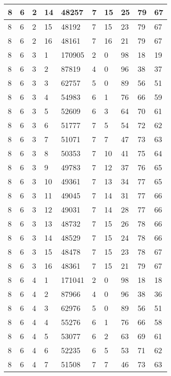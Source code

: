 \begin{table}[!ht]
\begin{tabular}{|l|l|l|l|l|l|l|l|l|l|}
        8 & 6 & 2 & 14 & 48257 & 7 & 15 & 25 & 79 & 67 \\ \hline
        8 & 6 & 2 & 15 & 48192 & 7 & 15 & 23 & 79 & 67 \\ \hline
        8 & 6 & 2 & 16 & 48161 & 7 & 16 & 21 & 79 & 67 \\ \hline
        8 & 6 & 3 & 1 & 170905 & 2 & 0 & 98 & 18 & 19 \\ \hline
        8 & 6 & 3 & 2 & 87819 & 4 & 0 & 96 & 38 & 37 \\ \hline
        8 & 6 & 3 & 3 & 62757 & 5 & 0 & 89 & 56 & 51 \\ \hline
        8 & 6 & 3 & 4 & 54983 & 6 & 1 & 76 & 66 & 59 \\ \hline
        8 & 6 & 3 & 5 & 52609 & 6 & 3 & 64 & 70 & 61 \\ \hline
        8 & 6 & 3 & 6 & 51777 & 7 & 5 & 54 & 72 & 62 \\ \hline
        8 & 6 & 3 & 7 & 51071 & 7 & 7 & 47 & 73 & 63 \\ \hline
        8 & 6 & 3 & 8 & 50353 & 7 & 10 & 41 & 75 & 64 \\ \hline
        8 & 6 & 3 & 9 & 49783 & 7 & 12 & 37 & 76 & 65 \\ \hline
        8 & 6 & 3 & 10 & 49361 & 7 & 13 & 34 & 77 & 65 \\ \hline
        8 & 6 & 3 & 11 & 49045 & 7 & 14 & 31 & 77 & 66 \\ \hline
        8 & 6 & 3 & 12 & 49031 & 7 & 14 & 28 & 77 & 66 \\ \hline
        8 & 6 & 3 & 13 & 48732 & 7 & 15 & 26 & 78 & 66 \\ \hline
        8 & 6 & 3 & 14 & 48529 & 7 & 15 & 24 & 78 & 66 \\ \hline
        8 & 6 & 3 & 15 & 48478 & 7 & 15 & 23 & 78 & 67 \\ \hline
        8 & 6 & 3 & 16 & 48361 & 7 & 15 & 21 & 79 & 67 \\ \hline
        8 & 6 & 4 & 1 & 171041 & 2 & 0 & 98 & 18 & 18 \\ \hline
        8 & 6 & 4 & 2 & 87966 & 4 & 0 & 96 & 38 & 36 \\ \hline
        8 & 6 & 4 & 3 & 62976 & 5 & 0 & 89 & 56 & 51 \\ \hline
        8 & 6 & 4 & 4 & 55276 & 6 & 1 & 76 & 66 & 58 \\ \hline
        8 & 6 & 4 & 5 & 53077 & 6 & 2 & 63 & 69 & 61 \\ \hline
        8 & 6 & 4 & 6 & 52235 & 6 & 5 & 53 & 71 & 62 \\ \hline
        8 & 6 & 4 & 7 & 51508 & 7 & 7 & 46 & 73 & 63 \\ \hline

\end{tabular}
\end{table}
